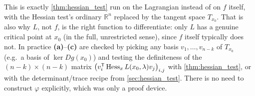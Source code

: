 \begin{remark}
This is exactly \cref{thm:hessian_test} run on the Lagrangian instead of on $f$ itself, with the
Hessian test's ordinary $\mathbb{R}^n$ replaced by the tangent space $T_{x_0}$. That is also why
$L$, not $f$, is the right function to differentiate: only $L$ has a genuine critical point at
$x_0$ (in the full, unrestricted sense), since $f$ itself typically does not. In practice
\textbf{(a)}--\textbf{(c)} are checked by picking any basis $v_1,\dots,v_{n-k}$ of $T_{x_0}$
(e.g.\ a basis of $\ker Dg(x_0)$) and testing the definiteness of the $(n-k)\times(n-k)$ matrix
$\big(v_i^{\mathsf{T}}\operatorname{Hess}_xL(x_0,\lambda)v_j\big)_{i,j}$ with \cref{thm:hessian_test}, or with the
determinant/trace recipe from \cref{sec:hessian_test}. There is no need to construct $\varphi$
explicitly, which was only a proof device.
\end{remark}

